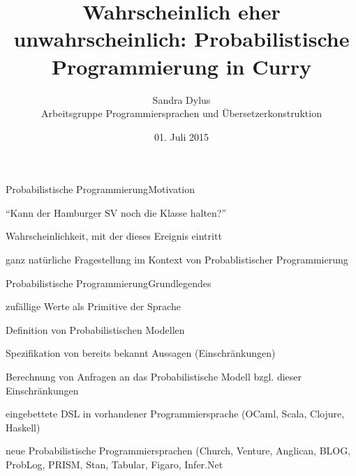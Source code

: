 \documentclass{beamer}
\title{Wahrscheinlich eher unwahrscheinlich: Probabilistische Programmierung in Curry}
\author{Sandra Dylus\\Arbeitsgruppe Programmiersprachen und \"Ubersetzerkonstruktion}
\date{01. Juli 2015}
\begin{document}
\begin{frame}
\maketitle
\end{frame}


\begin{frame}{Probabilistische Programmierung}{Motivation}

\begin{enumeration}
\item ``Kann der Hamburger SV noch die Klasse halten?''
\item Wahrscheinlichkeit, mit der dieses Ereignis eintritt
\item ganz nat\"urliche Fragestellung im Kontext von Probablistischer Programmierung
\end{enumeration}
\end{frame}

\begin{frame}{Probabilistische Programmierung}{Grundlegendes}
\begin{enumeration}
\item zuf\"allige Werte als Primitive der Sprache
\item Definition von Probabilistischen Modellen
\item Spezifikation von bereits bekannt Aussagen (Einschr\"ankungen)
\item Berechnung von Anfragen an das Probabilistische Modell bzgl. dieser Einschr\"ankungen
\end{enumeration}
\begin{enumeration}
\item eingebettete DSL in vorhandener Programmiersprache (OCaml, Scala, Clojure, Haskell) 
\item neue Probabilistische Programmiersprachen (Church, Venture, Anglican, BLOG, ProbLog, PRISM, Stan, Tabular, Figaro, Infer.Net
\end{enumeration}
\end{frame}

\begin{frame}

\end{frame}
\end{document}
